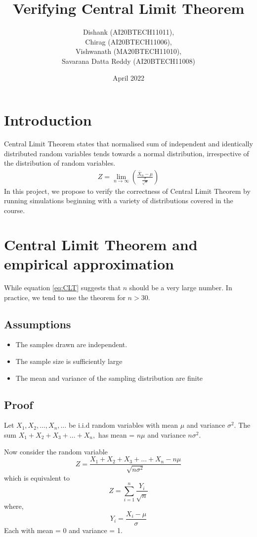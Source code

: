 \documentclass{article}
\title{Verifying Central Limit Theorem}
\author{Dishank (AI20BTECH11011),\\ Chirag (AI20BTECH11006),\\ Vishwanath (MA20BTECH11010),\\ Savarana Datta Reddy (AI20BTECH11008)}
\date{April 2022}
\begin{document}
\maketitle

\section{Introduction}
Central Limit Theorem states that normalised sum of independent and identically distributed random variables tends towards a normal distribution, irrespective of the distribution of random variables.
\begin{align}
    Z = \lim_{n \to \infty} \left(\frac{\bar{X}_n-\mu}{\frac{\sigma}{\sqrt{n}}}\right) \label{eq:CLT}
\end{align}
In this project, we propose to verify the correctness of Central Limit Theorem by running simulations beginning with a variety of distributions covered in the course.

\section{Central Limit Theorem and empirical approximation}
While equation \eqref{eq:CLT} suggests that $n$ should be a very large number. In practice, we tend to use the theorem for $n>30$. 
\subsection{Assumptions}
\begin{itemize}
\item  The samples drawn are independent.
\item  The sample size is sufficiently large
\item  The mean and variance of the sampling distribution are finite
\end{itemize}
\subsection{Proof}
Let $X_1,X_2,\dots,X_n,\dots$ be i.i.d random variables with mean $\mu$ and variance $\sigma^2$.
The sum $X_1+X_2+X_3+\dots+X_n,$ has mean = $n\mu$ and variance $n\sigma^2$.

Now consider the random variable 
\begin{equation}
    Z = \frac{X_1+X_2+X_3+\dots+X_n - n\mu}{\sqrt{n\sigma^2}}
\end{equation}
which is equivalent to 
\begin{equation}
    Z = \sum_{i=1}^n \frac{Y_i}{\sqrt{n}}
\end{equation}
where,
\begin{equation}
    Y_i = \frac{X_i-\mu}{\sigma}\label{a}
\end{equation}
Each with mean = 0 and variance = 1.
\end{document}
